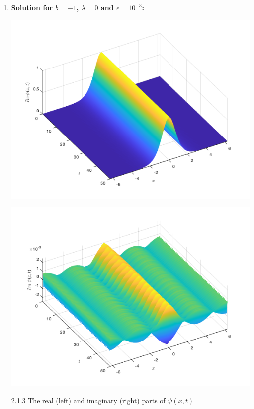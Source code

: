\documentclass[12pt, letterpaper, twoside]{article}
\begin{document}
\begin{enumerate}[label=(\roman*)]
\item \textbf{Solution for $b = -1$, $\lambda=0$ and $\epsilon = 10^{-3}$:}
\begin{multicols}{2}
\begin{center}
    \includegraphics[scale=0.35]{Figures/(b-1real).png}
\end{center}
\begin{center}
    \includegraphics[scale=0.35]{Figures/(b-1imag).png}
\end{center}
\end{multicols}
\figurename{ 2.1.3 The real (left) and imaginary (right) parts of $\psi(x, t)$}


\end{enumerate}
\end{document}
